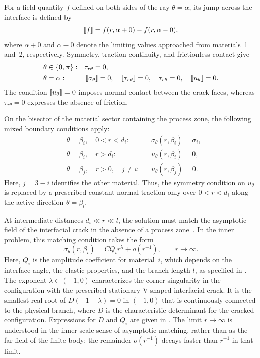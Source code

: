 For a field quantity $f$ defined on both sides of the ray
$\theta=\alpha$, its jump across the interface is defined by
\begin{equation*}
  \left[\!\left[f\right]\!\right]
  =f(r,\alpha+0)-f(r,\alpha-0),
\end{equation*}
where $\alpha+0$ and $\alpha-0$ denote the limiting values approached
from materials~1 and~2, respectively. Symmetry, traction continuity, and
frictionless contact give
\begin{equation}
\label{eq:interface-boundary-conditions}
\begin{aligned}
  &\theta\in\{0,\pi\}: &&\tau_{r\theta}=0,\\
  &\theta=\alpha: &&
    \left[\!\left[\sigma_\theta\right]\!\right]=0,
    \quad \left[\!\left[\tau_{r\theta}\right]\!\right]=0,
    \quad \tau_{r\theta}=0,
    \quad \left[\!\left[u_\theta\right]\!\right]=0.
\end{aligned}
\end{equation}
The condition $\left[\!\left[u_\theta\right]\!\right]=0$ imposes normal contact between the crack
faces, whereas $\tau_{r\theta}=0$ expresses the absence of friction.

On the bisector of the material sector containing the process zone, the
following mixed boundary conditions apply:
\begin{equation}
\label{eq:process-zone-boundary-conditions}
\begin{aligned}
  &\theta=\beta_i,\quad 0<r<d_i:
    &&\sigma_\theta(r,\beta_i)=\sigma_i,\\
  &\theta=\beta_i,\quad r>d_i:
    &&u_\theta(r,\beta_i)=0,\\
  &\theta=\beta_j,\quad r>0,\quad j\ne i:
    &&u_\theta(r,\beta_j)=0.
\end{aligned}
\end{equation}
Here, $j=3-i$ identifies the other material. Thus, the symmetry
condition on $u_\theta$ is replaced by a prescribed constant normal
traction only over $0<r<d_i$ along the active direction
$\theta=\beta_i$.

At intermediate distances $d_i\ll r\ll l$, the solution must match the
asymptotic field of the interfacial crack in the absence of a process
zone~\cite{NazarenkoKipnis2022Stress}. In the inner problem, this matching
condition takes the form
\begin{equation}
\label{eq:matched-far-field}
  \sigma_\theta(r,\beta_i)
    =CQ_i r^\lambda+o\!\left(r^{-1}\right),
    \qquad r\to\infty.
\end{equation}
Here, $Q_i$ is the amplitude coefficient for material~$i$, which depends
on the interface angle, the elastic properties, and the branch length
$l$, as specified in \AsymptoticsAppendix. The exponent
$\lambda\in(-1,0)$ characterizes the corner singularity in the
configuration with the prescribed stationary V-shaped interfacial crack. It is the smallest real root of
$D(-1-\lambda)=0$ in $(-1,0)$ that is continuously connected to the
physical branch, where $D$ is the characteristic determinant for the
cracked configuration. Expressions for $D$ and $Q_i$ are given in
\AsymptoticsAppendix. The limit $r\to\infty$ is understood in the
inner-scale sense of asymptotic matching, rather than as the far field
of the finite body; the remainder $o(r^{-1})$ decays faster than $r^{-1}$
in that limit.

